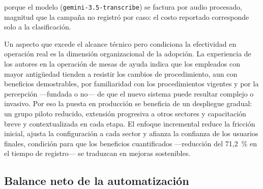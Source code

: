 porque el modelo (\texttt{gemini-3.5-transcribe}) se factura por audio procesado, magnitud que la campaña no registró por caso: el costo reportado corresponde solo a la clasificación.

Un aspecto que excede el alcance técnico pero condiciona la efectividad en operación real es la dimensión organizacional de la adopción. La experiencia de los autores en la operación de mesas de ayuda indica que los empleados con mayor antigüedad tienden a resistir los cambios de procedimiento, aun con beneficios demostrables, por familiaridad con los procedimientos vigentes y por la percepción ---fundada o no--- de que el nuevo sistema puede resultar complejo o invasivo. Por eso la puesta en producción se beneficia de un despliegue gradual: un grupo piloto reducido, extensión progresiva a otros sectores y capacitación breve y contextualizada en cada etapa. El enfoque incremental reduce la fricción inicial, ajusta la configuración a cada sector y afianza la confianza de los usuarios finales, condición para que los beneficios cuantificados ---reducción del 71,2~\% en el tiempo de registro--- se traduzcan en mejoras sostenibles.

\subsection{Balance neto de la automatización}\label{subsec:balance-neto}

